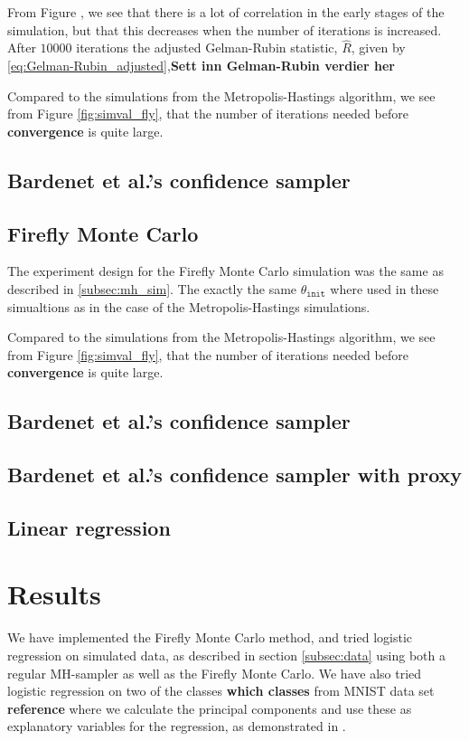 From Figure , we see that there is a lot of correlation in the early stages of the simulation, but that this decreases when the number of iterations is increased. After $10000$ iterations the adjusted Gelman-Rubin statistic, $\hat{R}$, given by \eqref{eq:Gelman-Rubin_adjusted},\textbf{Sett inn Gelman-Rubin verdier her}

Compared to the simulations from the Metropolis-Hastings algorithm, we see from Figure \ref{fig:simval_fly}, that the number of iterations needed before \textbf{convergence} is quite large. 


\subsection{Bardenet et al.'s confidence sampler}

\subsection{Firefly Monte Carlo}
The experiment design for the Firefly Monte Carlo simulation was the same as described in \ref{subsec:mh_sim}. The exactly the same $\theta_{\texttt{init}}$ where used in these simualtions as in the case of the Metropolis-Hastings simulations. 

Compared to the simulations from the Metropolis-Hastings algorithm, we see from Figure \ref{fig:simval_fly}, that the number of iterations needed before \textbf{convergence} is quite large. 



\subsection{Bardenet et al.'s confidence sampler}





\subsection{Bardenet et al.'s confidence sampler with proxy}





\subsection{Linear regression}

\section*{Results}
We have implemented the Firefly Monte Carlo method, and tried logistic regression on simulated data, as described in section \ref{subsec:data} using both a regular MH-sampler as well as the Firefly Monte Carlo. 
We have also tried logistic regression on two of the classes \textbf{which classes} from MNIST data set \textbf{reference} where we calculate the principal components and use these as explanatory variables for the regression, as demonstrated in \cite{Maclaurin:1}. 
